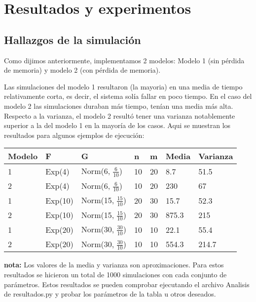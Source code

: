 \documentclass[11pt]{article}
\begin{document}
    \newpage

    \section{Resultados y experimentos}
    \subsection{Hallazgos de la simulación}
    Como dijimos anteriormente, implementamos 2 modelos: Modelo 1 (sin pérdida de memoria) y modelo 2 (con pérdida de memoria).

    Las simulaciones del modelo 1 resultaron (la mayoria) en una media de tiempo relativamente corta, es decir, el sistema solía 
    fallar en poco tiempo. En el caso del modelo 2 las simulaciones duraban más tiempo, tenían una media más alta. Respecto a la 
    varianza, el modelo 2 resultó tener una varianza notablemente superior a la del modelo 1 en la mayoría de los casos. Aqui se 
    muestran los resultados para algunos ejemplos de ejecución:

    \begin{table}[h]
        \begin{tabular}{|l|l|l|l|l|l|l|}
            \hline \textbf{Modelo} & \textbf{F} & \textbf{G} & \textbf{n} & \textbf{m} & \textbf{Media} & \textbf{Varianza} \\ 
            \hline 1 & Exp(4) & Norm(6, $\frac{6}{10}$) & 10 & 20 & 8.7 & 51.5 \\
            \hline 2 & Exp(4) & Norm(6, $\frac{6}{10}$) & 10 & 20 & 230 & 67 \\
            \hline 1 & Exp(10) & Norm(15, $\frac{15}{10}$) & 20 & 30 & 15.7 & 52.3 \\
            \hline 2 & Exp(10) & Norm(15, $\frac{15}{10}$) & 20 & 30 & 875.3 & 215 \\
            \hline 1 & Exp(20) & Norm(30, $\frac{30}{10}$) & 10 & 10 & 22.1 & 55.4 \\
            \hline 2 & Exp(20) & Norm(30, $\frac{30}{10}$) & 10 & 10 & 554.3 & 214.7 \\
            \hline
        \end{tabular}
    \end{table}

    \noindent \textbf{nota:} Los valores de la media y varianza son aproximaciones. Para estos resultados se hicieron un total de 1000 
    simulaciones con cada conjunto de parámetros. Estos resultados se pueden comprobar ejecutando el archivo Analisis de resultados.py 
    y probar los parámetros de la tabla u otros deseados.
\end{document}
